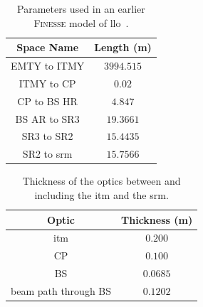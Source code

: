 \begin{table}[ht]
	\centering
	\begin{tabular}{ c | c }
		Space Name & Length (m) \\
		\hline
		EMTY to ITMY & $3994.515$ \\
		ITMY to CP & $0.02$ \\
		CP to BS HR & $4.847$ \\
		BS AR to SR3 & $19.3661$ \\
		SR3 to SR2 & $15.4435$ \\
		SR2 to \gls{srm} &  $15.7566$ \\
	\end{tabular}
	\caption[Parameters used in an earlier \textsc{Finesse} model of LLO.]{Parameters used in an earlier \textsc{Finesse} model of \gls{llo}~\cite{l1_finesse_2014}.}
	\label{tab:finesse_spacings}
\end{table}
\begin{table}[ht]
	\centering
	\begin{tabular}{ c | c }
		Optic & Thickness (m) \\
		\hline
		\gls{itm} & $0.200$ \\
		CP & $0.100$ \\
		BS & $0.0685$ \\
		beam path through BS & $0.1202$ \\
	\end{tabular}
	\caption[Thickness of the optics between and including the ITM and the SRM.]{Thickness of the optics between and including the \gls{itm} and the \gls{srm}.}
	\label{tab:optic_thickness}
\end{table}
\clearpage
